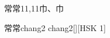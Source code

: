 \begin{entry}{常常}{11,11}{⼱、⼱}
  \begin{phonetics}{常常}{chang2 chang2}[][HSK 1]
  \end{phonetics}
\end{entry}
